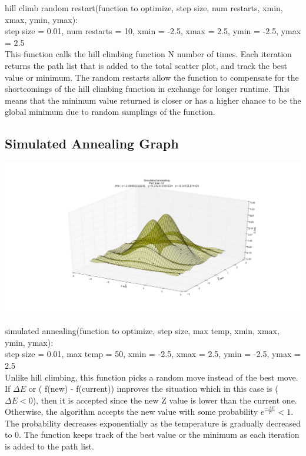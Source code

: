 \documentclass{article}
\begin{document}
	hill climb random restart(function to optimize, step size, num restarts, xmin, xmax, ymin, ymax):\\
	step size = 0.01, num restarts = 10, xmin = -2.5, xmax = 2.5, ymin = -2.5, ymax = 2.5\\
	
	This function calls the hill climbing function N number of times. Each iteration returns the path list that is added to the total scatter plot, and track the best value or minimum. The random restarts allow the function to compensate for the shortcomings of the hill climbing function in exchange for longer runtime. This means that the minimum value returned is closer or has a higher chance to be the global minimum due to random samplings of the function.\\
  
  
  \subsection{Simulated Annealing Graph}
  \includegraphics[width=1.1\textwidth]{figure_3h.png}
   
   simulated annealing(function to optimize, step size, max temp, xmin, xmax, ymin, ymax):\\
   step size = 0.01, max temp = 50, xmin = -2.5, xmax = 2.5, ymin = -2.5, ymax = 2.5\\
   
   Unlike hill climbing, this function picks a random move instead of the best move. If $\Delta E$ or ( f(new) - f(current)) improves the situation which in this case is ($\Delta E < 0$), then it is accepted since the new Z value is lower than the current one. Otherwise, the algorithm accepts the new value with some probability $e^\frac{-\Delta E}{T} < 1$. The probability decreases exponentially as the temperature is gradually decreased to 0. The function keeps track of the best value or the minimum as each iteration is added to the path list.
	  
\end{document}
